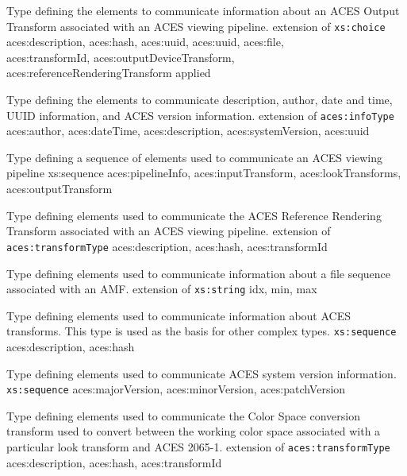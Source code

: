                 {Type defining the elements to communicate information about an ACES Output Transform associated with an ACES viewing pipeline.}
                {extension of \texttt{xs:choice}}
                {aces:description, aces:hash, aces:uuid, aces:uuid, aces:file,\\ aces:transformId, aces:outputDeviceTransform,\\ aces:referenceRenderingTransform}
                {applied}

            {Type defining the elements to communicate description, author, date and time, UUID information, and ACES version information.}
            {extension of \texttt{aces:infoType}}
            {aces:author, aces:dateTime, aces:description, aces:systemVersion, aces:uuid}
            
            {Type defining a sequence of elements used to communicate an ACES viewing pipeline}
            {xs:sequence}
            {aces:pipelineInfo, aces:inputTransform, aces:lookTransforms,\\ aces:outputTransform}
 
            {Type defining elements used to communicate the ACES Reference Rendering Transform associated with an ACES viewing pipeline.}
            {extension of \texttt{aces:transformType}}
            {aces:description, aces:hash, aces:transformId}

                {Type defining elements used to communicate information about a file sequence associated with an AMF.}
                {extension of \texttt{xs:string}}
                {idx, min, max}

            {Type defining elements used to communicate information about ACES transforms.  This type is used as the basis for other complex types.}
            {\texttt{xs:sequence}}
            {aces:description, aces:hash}

            {Type defining elements used to communicate ACES system version information.}
            {\texttt{xs:sequence}}
            {aces:majorVersion, aces:minorVersion, aces:patchVersion}

            {Type defining elements used to communicate the Color Space conversion transform used to convert between the working color space associated with a particular look transform and ACES 2065-1.}
            {extension of \texttt{aces:transformType}}
            {aces:description, aces:hash, aces:transformId}
